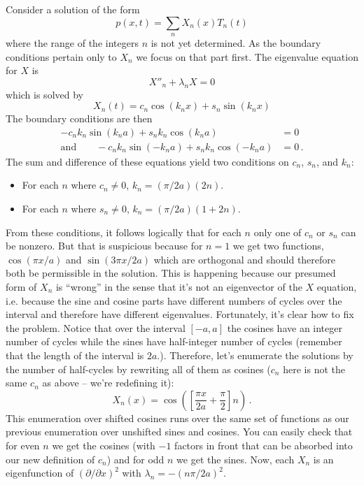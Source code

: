 Consider a solution of the form
\begin{equation*}
  p(x, t) = \sum_n X_n(x) T_n(t)
\end{equation*}
where the range of the integers $n$ is not yet determined.
As the boundary conditions pertain only to $X_n$ we focus on that part first.
The eigenvalue equation for $X$ is
\begin{equation*}
  X''_n + \lambda_n X = 0
\end{equation*}
which is solved by
\begin{equation*}
  X_n(t) = c_n \cos(k_n x) + s_n \sin(k_n x)
\end{equation*}
The boundary conditions are then
\begin{eqnarray*}
  - c_n k_n \sin(k_n a) + s_n k_n \cos(k_n a) &= 0 \\
  \text{and} \qquad
  - c_n k_n \sin(-k_n a) + s_n k_n \cos(-k_n a) &= 0
  \, .
\end{eqnarray*}
The sum and difference of these equations yield two conditions on $c_n$, $s_n$, and $k_n$:
\begin{itemize}
  \item For each $n$ where $c_n \neq 0$, $k_n = (\pi / 2 a) (2 n)$.
  \item For each $n$ where $s_n \neq 0$, $k_n = (\pi / 2 a) (1 + 2n)$.
\end{itemize}
From these conditions, it follows logically that for each $n$ only one of $c_n$ or $s_n$ can be nonzero.
But that is suspicious because for $n=1$ we get two functions, $\cos(\pi x / a)$ and $\sin(3 \pi x / 2 a)$ which are orthogonal and should therefore both be permissible in the solution.
This is happening because our presumed form of $X_n$ is ``wrong'' in the sense that it's not an eigenvector of the $X$ equation, i.e. because the sine and cosine parts have different numbers of cycles over the interval and therefore have different eigenvalues.
Fortunately, it's clear how to fix the problem.
Notice that over the interval $[-a, a]$ the cosines have an integer number of cycles while the sines have half-integer number of cycles (remember that the length of the interval is $2 a$.).
Therefore, let's enumerate the solutions by the number of half-cycles by rewriting all of them as cosines ($c_n$ here is not the same $c_n$ as above -- we're redefining it):
\begin{equation*}
  X_n(x) = \cos \left( \left[ \frac{\pi x}{2 a} + \frac{\pi}{2} \right] n \right)
  \, .
\end{equation*}
This enumeration over shifted cosines runs over the same set of functions as our previous enumeration over unshifted sines and cosines.
You can easily check that for even $n$ we get the cosines (with $-1$ factors in front that can be absorbed into our new definition of $c_n$) and for odd $n$ we get the sines.
Now, each $X_n$ is an eigenfunction of $(\partial / \partial x)^2$ with $\lambda_n = - (n \pi / 2 a)^2$.

